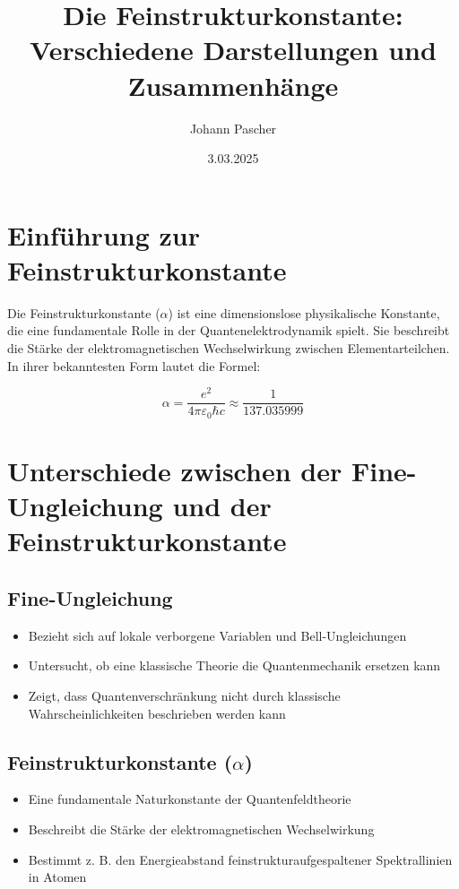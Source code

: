 \documentclass{article}
\title{Die Feinstrukturkonstante: Verschiedene Darstellungen und Zusammenhänge}
\author{Johann Pascher}
\date{3.03.2025}
\begin{document}
	
	\maketitle
	\tableofcontents
	\section{Einführung zur Feinstrukturkonstante}
	
	Die Feinstrukturkonstante ($\alpha$) ist eine dimensionslose physikalische Konstante, die eine fundamentale Rolle in der Quantenelektrodynamik spielt. Sie beschreibt die Stärke der elektromagnetischen Wechselwirkung zwischen Elementarteilchen. In ihrer bekanntesten Form lautet die Formel:
	
	\begin{equation}
		\alpha = \frac{e^2}{4\pi\varepsilon_0\hbar c} \approx \frac{1}{137.035999}
	\end{equation}
	
	\section{Unterschiede zwischen der Fine-Ungleichung und der Feinstrukturkonstante}
	
	\subsection{Fine-Ungleichung}
	\begin{itemize}
		\item Bezieht sich auf lokale verborgene Variablen und Bell-Ungleichungen
		\item Untersucht, ob eine klassische Theorie die Quantenmechanik ersetzen kann
		\item Zeigt, dass Quantenverschränkung nicht durch klassische Wahrscheinlichkeiten beschrieben werden kann
	\end{itemize}
	
	\subsection{Feinstrukturkonstante ($\alpha$)}
	\begin{itemize}
		\item Eine fundamentale Naturkonstante der Quantenfeldtheorie
		\item Beschreibt die Stärke der elektromagnetischen Wechselwirkung
		\item Bestimmt z. B. den Energieabstand feinstrukturaufgespaltener Spektrallinien in Atomen
	\end{itemize}
	
\end{document}
